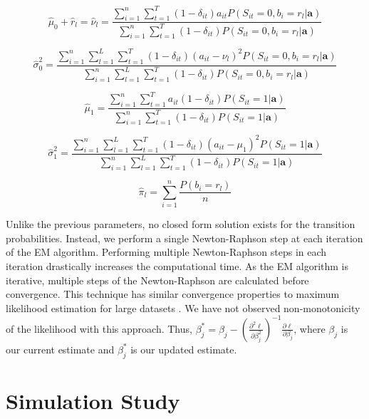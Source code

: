 \documentclass[num-refs]{wiley-article}
\begin{document}
\begin{equation}\label{mu0}
    \hat{\mu}_0 + \hat{r}_l = \hat{\nu}_l = 
    \frac{\sum_{i=1}^n \sum_{t=1}^T (1-\delta_{it})a_{it}P(S_{it}=0,b_{i}=r_l|\textbf{a})}
    {\sum_{i=1}^n \sum_{t=1}^T (1-\delta_{it})P(S_{it}=0,b_{i}=r_l|\textbf{a})}
\end{equation} 

\begin{equation}\label{sig0}
    \hat{\sigma}_0^2 = 
    \frac{\sum_{i=1}^n \sum_{l=1}^L \sum_{t=1}^T (1-\delta_{it})(a_{it}-\nu_l)^2 P(S_{it}=0,b_{i}=r_l|\textbf{a})}
        {\sum_{i=1}^n \sum_{l=1}^L \sum_{t=1}^T (1-\delta_{it}) P(S_{it}=0,b_{i}=r_l|\textbf{a})}
\end{equation} 

\begin{equation}\label{mu1}
    \hat{\mu}_1 = 
    \frac{\sum_{i=1}^n \sum_{t=1}^T a_{it}(1-\delta_{it})P(S_{it}=1|\textbf{a})}
        {\sum_{i=1}^n \sum_{t=1}^T (1-\delta_{it})P(S_{it}=1|\textbf{a})}
\end{equation} 

\begin{equation}\label{sig1}
    \hat{\sigma}_1^2 = 
    \frac{\sum_{i=1}^n \sum_{l=1}^L \sum_{t=1}^T (1-\delta_{it})(a_{it}-\mu_1)^2 P(S_{it}=1|\textbf{a})}
        {\sum_{i=1}^n \sum_{l=1}^L \sum_{t=1}^T (1-\delta_{it}) P(S_{it}=1|\textbf{a})}
\end{equation} 

\begin{equation}\label{pi}
    \hat{\pi}_l = \sum_{i = 1}^n \frac{P(b_i = r_l)}{n}
\end{equation}


Unlike the previous parameters, no closed form solution exists for the transition probabilities. Instead, we perform a single Newton-Raphson step at each iteration of the EM algorithm. Performing multiple Newton-Raphson steps in each iteration drastically increases the computational time. As the EM algorithm is iterative, multiple steps of the Newton-Raphson are calculated before convergence. This technique has similar convergence properties to maximum likelihood estimation for large datasets \cite{brousteOneStepCamOnestep2021}. We have not observed non-monotonicity of the likelihood with this approach. Thus, $\beta_{j}^* = \beta_{j} - (\frac{\partial^2\ell}{\partial \beta_{j}^2})^{-1} \frac{\partial\ell}{\partial \beta_{j}}$, where $\beta_{j}$ is our current estimate and $\beta_{j}^*$ is our updated estimate. 

\section{Simulation Study}\label{SimStudy}
\end{document}
